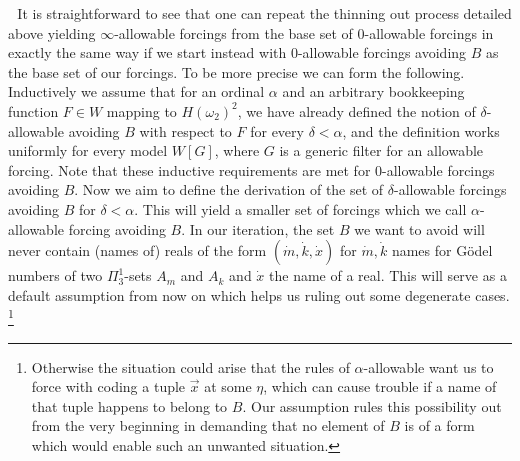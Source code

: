 \documentclass[a4paper,11pt]{article}
\begin{document}
    ﻿
    ﻿
    It is straightforward to see that one can repeat the thinning out process detailed above yielding $\infty$-allowable forcings from the base set of 0-allowable forcings in exactly the same way if we start instead  with 0-allowable forcings avoiding $B$  as the base set of our forcings. To be more precise we can form the following.  Inductively we assume that for an ordinal $\alpha$ and an arbitrary bookkeeping function $F \in W$ mapping to $H(\omega_2)^2$, we have already defined the notion of $\delta$-allowable avoiding $B$ with respect to $F$ for every $\delta < \alpha$, and the definition works uniformly for every model $W[G]$, where $G$ is a generic filter for an allowable forcing. Note that these inductive requirements are met for $0$-allowable forcings avoiding $B$. Now we aim to define the derivation of the set of $\delta$-allowable forcings avoiding $B$ for $\delta < \alpha$. This will yield a smaller set of forcings which we call $\alpha$-allowable forcing avoiding $B$. In our iteration, the set $B$ we want to avoid will never contain (names of) reals of the form $(\dot{m},\dot{k},\dot{x})$ for $\dot{m}, \dot{k}$ names for G\"odel numbers of two $\Pi^1_3$-sets $A_m$ and $A_k$ and $\dot{x}$ the name of a real. This will serve as a default assumption from now on which helps us ruling out some degenerate cases. \footnote{Otherwise the situation could arise that the rules of $\alpha$-allowable want us to force with coding a tuple $\vec{x}$ at some $\eta$, which can cause trouble if a name of that tuple happens to belong to $B$. Our assumption rules this possibility out from the very beginning in demanding that no element of $B$ is of a form which would enable such an unwanted situation.}
    ﻿
\end{document}
